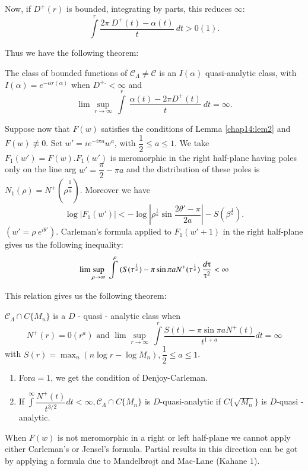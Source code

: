 Now, if $D^+(r)$ is bounded, integrating by parts, this reduces $\infty$:
$$
\int\limits^r \frac{2\pi ~ D^+(t) - \alpha (t)}{t} ~ dt > 0(1).
$$

Thus we have the following theorem:

\begin{theorem}\label{chap21:sec2:thm3}%
 The class of bounded functions of $\mathscr{C}_\Lambda \neq
 \mathscr{C}$ is an $I (\alpha)$ quasi-analytic class, with
 $I(\alpha) = e^{-\alpha r(\alpha)}$ when $D^{+.} < \infty$ and 
 $$
 \lim\sup_{r\rightarrow \infty} ~ \int\limits^r ~ \frac{\alpha(t) -
 2\pi D^+(t)}{t} ~ dt = \infty. 
 $$
\end{theorem}

Suppose now that $F(w)$ satisfies the conditions of Lemma \ref{chap14:lem2} and
$F(w) \nequiv 0$. Set $w' = ie^{-i\pi a} w^a$, with $\dfrac{1}{2} \le
a \le 1$. We take $F_1(w') = F(w).F_1(w')$ is meromorphic in the right
half-plane having poles only on the line arg $w' = \dfrac{\pi}{2} -
\pi a$ and the distribution of these poles is $N_1 (\rho) = N^+
(\rho^{\dfrac{1}{a}})$. Moreover we have 
$$
\log | F_1 (w') | < - \log | \rho^{\frac{1}{a}} \sin \frac{2\theta' -
 \pi}{2a} | - S(\beta^{\frac{1}{a}}). 
$$
$(w' = \rho ~ e^{i\theta'})$. Carleman's formula applied to $F_1(w' +
1)$ in the right half-plane gives us the following inequality: 
$$
\lim\sup_{\rho \rightarrow \infty} ~\int\limits^\rho ~
(S(\tau^{\frac{1}{a}}) -\pi \sin \pi a N^+(\tau^{\frac{1}{a}}) ~
\frac{d\tauup}{\tauup^2} < \infty 
$$

This relation gives us the following theorem:

\begin{theorem}\label{chap21:sec2:thm4}%
 $\mathscr{C}_\Lambda \cap C \{M_n \}$ is a $D$ - quasi - analytic class when 
 $$
 N^+ (r) = 0(r^a) \text{ and } \lim\sup_{r \rightarrow \infty} ~
 \int\limits^r \frac{S(t) - \pi \sin \pi a N^+(t)}{t^{1+a}} dt =
 \infty 
 $$
 with $S(r) = \max_n (n \log r - \log M_n),\dfrac{1}{2} \le a \le 1$.
\end{theorem}

\begin{remarks*}%
 \begin{enumerate}[1)]
 \item For\pageoriginale $a = 1$, we get the condition of Denjoy-Carleman.
 \item If $\int\limits^\infty \dfrac{N^+(t)}{t^{3/2}} dt < \infty,
 \mathscr{C}_\Lambda \cap C \{M_n \}$ is $D$-quasi-analytic if
 $C\{\sqrt{M_n} \}$ is $D$-quasi - analytic. 
 \end{enumerate}
\end{remarks*}

When $F(w)$ is not meromorphic in a right or left half-plane we cannot
apply either Carleman's or Jensel's formula. Partial results in this
direction can be got by applying a formula due to Mandelbrojt and
Mac-Lane (Kahane $1$). 
